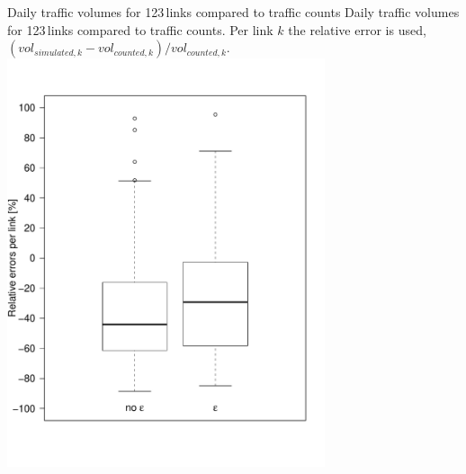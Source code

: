 \createfigure%
{Daily traffic volumes for 123\,links compared to traffic counts}%
{Daily traffic volumes for 123\,links compared to traffic counts. Per link $k$ the relative error is used, \ie $(vol_{simulated,k}-vol_{counted,k}) / vol_{counted,k}$.}%
{\label{fig:countsLEGO}}%
{\includegraphics[width=0.7\textwidth, angle=0]{extending/figures/dc/zhCounts.pdf}}%
{}



